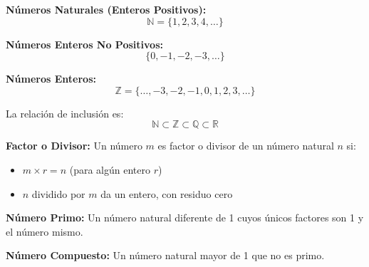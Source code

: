 
\begin{definition}
\textbf{Números Naturales (Enteros Positivos):}
$$\mathbb{N} = \{1, 2, 3, 4, \ldots\}$$

\textbf{Números Enteros No Positivos:}
$$\{0, -1, -2, -3, \ldots\}$$

\textbf{Números Enteros:}
$$\mathbb{Z} = \{\ldots, -3, -2, -1, 0, 1, 2, 3, \ldots\}$$
\end{definition}

\begin{center}
\end{center}

La relación de inclusión es:
$$\mathbb{N} \subset \mathbb{Z} \subset \mathbb{Q} \subset \mathbb{R}$$


\begin{definition}
\textbf{Factor o Divisor:} Un número $m$ es factor o divisor de un número natural $n$ si:
\begin{itemize}
    \item $m \times r = n$ (para algún entero $r$)
    \item $n$ dividido por $m$ da un entero, con residuo cero
\end{itemize}

\textbf{Número Primo:} Un número natural diferente de 1 cuyos únicos factores son 1 y el número mismo.

\textbf{Número Compuesto:} Un número natural mayor de 1 que no es primo.
\end{definition}


